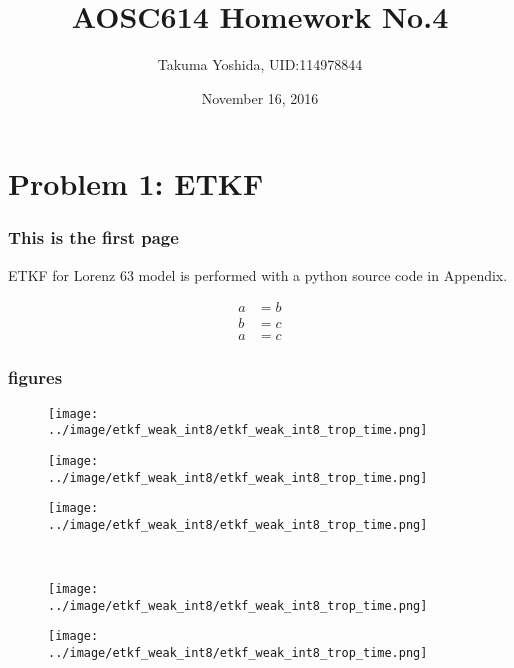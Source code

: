 \documentclass{beamer}
\title{AOSC614 Homework No.4}
\date{November 16, 2016}
\author{Takuma Yoshida, UID:114978844}
\begin{document}
\maketitle

\section*{Problem 1: ETKF}
\begin{frame}
\frametitle{This is the first page}
ETKF for Lorenz 63 model is performed with a python source code in Appendix.

\begin{align}
a &= b \\
b &= c \\
a &= c
\end{align}
\end{frame}

\begin{frame}
\frametitle{figures}
\begin{figure}[h]
  \flushleft
  \begin{minipage}[b]{0.32\linewidth}
    \centering
    \texttt{[image: ../image/etkf\_weak\_int8/etkf\_weak\_int8\_trop\_time.png]}
  \end{minipage}
  \begin{minipage}[b]{0.32\linewidth}
    \centering
    \texttt{[image: ../image/etkf\_weak\_int8/etkf\_weak\_int8\_trop\_time.png]}
  \end{minipage}
  \begin{minipage}[b]{0.32\linewidth}
    \centering
    \texttt{[image: ../image/etkf\_weak\_int8/etkf\_weak\_int8\_trop\_time.png]}
  \end{minipage}\\

  \begin{minipage}[b]{0.32\linewidth}
    \centering
    \texttt{[image: ../image/etkf\_weak\_int8/etkf\_weak\_int8\_trop\_time.png]}
  \end{minipage}
  \begin{minipage}[b]{0.32\linewidth}
    \centering
    \texttt{[image: ../image/etkf\_weak\_int8/etkf\_weak\_int8\_trop\_time.png]}
  \end{minipage}
\end{figure}
\end{frame}
\end{document}
